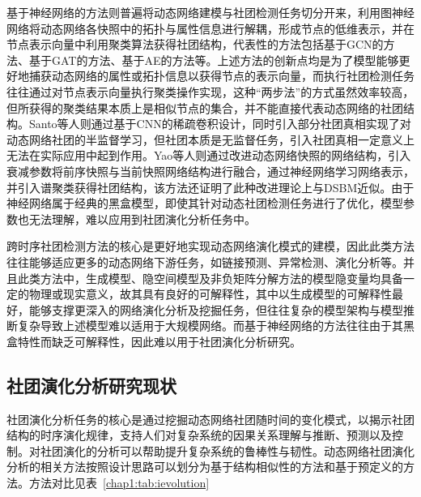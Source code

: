基于神经网络的方法则普遍将动态网络建模与社团检测任务切分开来，利用图神经网络将动态网络各快照中的拓扑与属性信息进行解耦，形成节点的低维表示，并在节点表示向量中利用聚类算法获得社团结构，代表性的方法包括基于GCN的方法\cite{ma2020streaming,pareja2020evolvegcn}、基于GAT的方法\cite{cui2019hierarchical}、基于AE的方法\cite{goyal2018dyngem,yu2018netwalk,zhao2019large,goyal2020dyngraph2vec}等。上述方法的创新点均是为了模型能够更好地捕获动态网络的属性或拓扑信息以获得节点的表示向量，而执行社团检测任务往往通过对节点表示向量执行聚类操作实现，这种“两步法”的方式虽然效率较高，但所获得的聚类结果本质上是相似节点的集合，并不能直接代表动态网络的社团结构。Santo等人\cite{de2021deep}则通过基于CNN的稀疏卷积设计，同时引入部分社团真相实现了对动态网络社团的半监督学习，但社团本质是无监督任务，引入社团真相一定意义上无法在实际应用中起到作用。Yao等人\cite{yao2021interpretable}则通过改进动态网络快照的网络结构，引入衰减参数将前序快照与当前快照网络结构进行融合，通过神经网络学习网络表示，并引入谱聚类获得社团结构，该方法还证明了此种改进理论上与DSBM近似。由于神经网络属于经典的黑盒模型，即使其针对动态社团检测任务进行了优化，模型参数也无法理解，难以应用到社团演化分析任务中。

跨时序社团检测方法的核心是更好地实现动态网络演化模式的建模，因此此类方法往往能够适应更多的动态网络下游任务，如链接预测、异常检测、演化分析等。并且此类方法中，生成模型、隐空间模型及非负矩阵分解方法的模型隐变量均具备一定的物理或现实意义，故其具有良好的可解释性，其中以生成模型的可解释性最好，能够支撑更深入的网络演化分析及挖掘任务，但往往复杂的模型架构与模型推断复杂导致上述模型难以适用于大规模网络。而基于神经网络的方法往往由于其黑盒特性而缺乏可解释性，因此难以用于社团演化分析研究。




\subsection{社团演化分析研究现状}

社团演化分析任务的核心是通过挖掘动态网络社团随时间的变化模式，以揭示社团结构的时序演化规律，支持人们对复杂系统的因果关系理解与推断、预测以及控制。对社团演化的分析可以帮助提升复杂系统的鲁棒性与韧性。动态网络社团演化分析的相关方法按照设计思路可以划分为基于结构相似性的方法和基于预定义的方法。方法对比见表~\ref{chap1:tab:ievolution}

